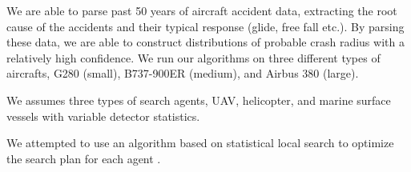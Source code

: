 \documentclass[12pt, letterpaper]{article}  %
\theoremstyle{definition}
\theoremstyle{remark}
\theoremstyle{plain}
\begin{document}



We are able to parse past 50 years of aircraft accident
data, extracting the root cause of the accidents and their typical response (glide, free fall etc.). By parsing these data, we are able to construct distributions of probable crash radius with a relatively high confidence.  We run our algorithms on three different types of aircrafts, G280 (small), B737-900ER (medium), and Airbus 380 (large). 

We assumes three types of search agents, UAV, helicopter, and marine surface vessels with variable detector statistics.

We attempted to use an algorithm based on statistical local search to optimize the search plan for each agent \cite{13kagan}.



\end{document}
